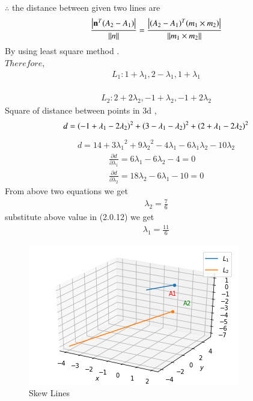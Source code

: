 \documentclass[journal,12pt,twocolumn]{IEEEtran}
\begin{document}
\\
$\therefore$ the distance between given two lines are
\begin{align}
\frac{\left\vert\mathbf{n}^T(A_2-A_1)\right\vert}{\left\lVert n\right\rVert} = \frac{\left\vert(A_2-A_1)^T(m_1 \times m_2)\right\vert}{\left\lVert m_1 \times m_2\right\rVert}
\end{align}
By using least square method .
\\
$Therefore$,
\\
\begin{align}
{L_1} : {1 + \lambda_1} , {2 - \lambda_1} , {1 + \lambda_1}
\end{align}
\\
\begin{align}
{L_2} : {2 + 2\lambda_2} , {-1 + \lambda_2} , {-1 + 2\lambda_2}
\end{align}
Square of distance between points in 3d ,
\begin{align}
{d} = \left(-1+\lambda_1-2\lambda_2\right)^2 + \left(3-\lambda_1-\lambda_2\right)^2 + \left(2+\lambda_1-2\lambda_2\right)^2
\end{align}
\begin{align}
{d} = 14+3{\lambda_1}^2+9{\lambda_2}^2-4{\lambda_1}-6{\lambda_1\lambda_2}-10{\lambda_2}
\end{align}
\begin{align}
\frac{\partial d}{\partial \lambda_1} = 6{\lambda_1}-6{\lambda_2}-4 = 0
\\
\frac{\partial d}{\partial \lambda_2} = 18{\lambda_2}-6{\lambda_1}-10 =0
\end{align}
From above two equations we get 
\begin{align}
{\lambda_2} = \frac{7}{6}
\end{align}
substitute above value in (2.0.12) we get 
\begin{align}
{\lambda_1} = \frac{11}{6}
\end{align}
\begin{figure}[!ht]
\centering
\includegraphics[width=\columnwidth]{download (7).png}
\caption{Skew Lines}
\label{fig: Skew Lines}	
\end{figure}
\end{document}
